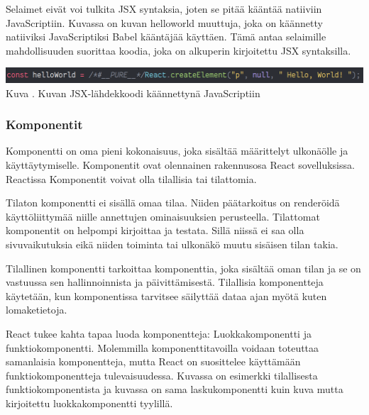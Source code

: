Selaimet eivät voi tulkita JSX syntaksia, joten se pitää kääntää natiiviin JavaScriptiin.
Kuvassa \nextImageCount{} on kuvan \theimgCounter{} helloworld muuttuja, joka on käännetty natiiviksi JavaScriptiksi Babel kääntäjää käyttäen.
Tämä antaa selaimille mahdollisuuden suorittaa koodia, joka on alkuperin kirjoitettu JSX syntaksilla.
\medskip


\bigskip
\includegraphics[width=15cm]{src/public/oppar/transpiled_jsx_example.png}\\
Kuva \getImgCount {}. Kuvan \prevImageCount{} JSX-lähdekkoodi käännettynä JavaScriptiin
\medskip





\subsubsection{Komponentit}





Komponentti on oma pieni kokonaisuus, joka sisältää määrittelyt ulkonäölle ja käyttäytymiselle.
Komponentit ovat olennainen rakennusosa React sovelluksissa.
Reactissa Komponentit voivat olla tilallisia tai tilattomia. 
\medskip



Tilaton komponentti ei sisällä omaa tilaa. 
Niiden päätarkoitus on renderöidä käyttöliittymää niille annettujen ominaisuuksien perusteella.
Tilattomat komponentit on helpompi kirjoittaa ja testata. 
Sillä niissä ei saa olla sivuvaikutuksia eikä niiden toiminta tai ulkonäkö muutu sisäisen tilan takia.
\medskip


Tilallinen komponentti tarkoittaa komponenttia, 
joka sisältää oman tilan ja se on vastuussa sen hallinnoinnista ja päivittämisestä.
Tilallisia komponentteja käytetään, kun komponentissa tarvitsee säilyttää dataa ajan myötä 
kuten lomaketietoja.\\
\medskip






React tukee kahta tapaa luoda komponentteja: Luokkakomponentti ja funktiokomponentti.
Molemmilla komponenttitavoilla voidaan toteuttaa samanlaisia komponentteja, mutta React on suosittelee käyttämään funktiokomponentteja tulevaisuudessa. 
Kuvassa \nextImageCount {} on esimerkki tilallisesta funktiokomponentista ja
kuvassa \nextnextImageCount {} on sama laskukomponentti kuin kuva \nextImageCount{} mutta kirjoitettu luokkakomponentti tyylillä. 
\medskip


